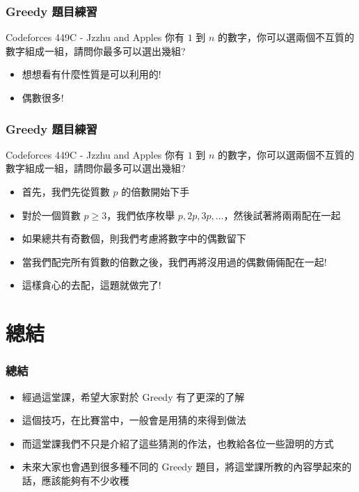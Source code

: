 \documentclass[aspectratio=169]{beamer}
\begin{document}
\begin{frame}
\frametitle{Greedy 題目練習}
    \begin{block}{Codeforces 449C - Jzzhu and Apples}
        你有 $1$ 到 $n$ 的數字，你可以選兩個不互質的數字組成一組，請問你最多可以選出幾組?
    \end{block}
    \begin{itemize}
        \item<2-> 想想看有什麼性質是可以利用的!
        \item<3-> 偶數很多!
    \end{itemize}
\end{frame}

\begin{frame}
\frametitle{Greedy 題目練習}
    \begin{block}{Codeforces 449C - Jzzhu and Apples}
        你有 $1$ 到 $n$ 的數字，你可以選兩個不互質的數字組成一組，請問你最多可以選出幾組?
    \end{block}
    \begin{itemize}
        \item<1-> 首先，我們先從質數 $p$ 的倍數開始下手
        \item<2-> 對於一個質數 $p \ge 3$，我們依序枚舉 $p,2p,3p,\ldots$，然後試著將兩兩配在一起
        \item<3-> 如果總共有奇數個，則我們考慮將數字中的偶數留下
        \item<4-> 當我們配完所有質數的倍數之後，我們再將沒用過的偶數倆倆配在一起!
        \item<5-> 這樣貪心的去配，這題就做完了!
    \end{itemize}
\end{frame}

\section{總結}

\begin{frame}
\frametitle{總結}
    \begin{itemize}
        \item 經過這堂課，希望大家對於 Greedy 有了更深的了解
        \item 這個技巧，在比賽當中，一般會是用猜的來得到做法
        \item 而這堂課我們不只是介紹了這些猜測的作法，也教給各位一些證明的方式
        \item 未來大家也會遇到很多種不同的 Greedy 題目，將這堂課所教的內容學起來的話，應該能夠有不少收穫
    \end{itemize}
\end{frame}

\end{document}
